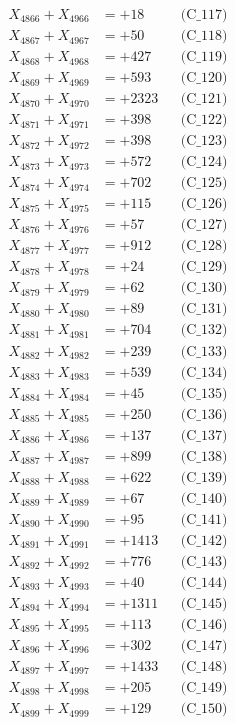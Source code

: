 \documentclass[a4paper,10pt]{article}
\begin{document}
{\begin{align}
X_{4866} + X_{4966} &= +18 && \text{(C\_117)} \\
X_{4867} + X_{4967} &= +50 && \text{(C\_118)} \\
X_{4868} + X_{4968} &= +427 && \text{(C\_119)} \\
X_{4869} + X_{4969} &= +593 && \text{(C\_120)} \\
\allowbreak
X_{4870} + X_{4970} &= +2323 && \text{(C\_121)} \\
X_{4871} + X_{4971} &= +398 && \text{(C\_122)} \\
X_{4872} + X_{4972} &= +398 && \text{(C\_123)} \\
X_{4873} + X_{4973} &= +572 && \text{(C\_124)} \\
X_{4874} + X_{4974} &= +702 && \text{(C\_125)} \\
\allowbreak
X_{4875} + X_{4975} &= +115 && \text{(C\_126)} \\
X_{4876} + X_{4976} &= +57 && \text{(C\_127)} \\
X_{4877} + X_{4977} &= +912 && \text{(C\_128)} \\
X_{4878} + X_{4978} &= +24 && \text{(C\_129)} \\
X_{4879} + X_{4979} &= +62 && \text{(C\_130)} \\
\allowbreak
X_{4880} + X_{4980} &= +89 && \text{(C\_131)} \\
X_{4881} + X_{4981} &= +704 && \text{(C\_132)} \\
X_{4882} + X_{4982} &= +239 && \text{(C\_133)} \\
X_{4883} + X_{4983} &= +539 && \text{(C\_134)} \\
X_{4884} + X_{4984} &= +45 && \text{(C\_135)} \\
\allowbreak
X_{4885} + X_{4985} &= +250 && \text{(C\_136)} \\
X_{4886} + X_{4986} &= +137 && \text{(C\_137)} \\
X_{4887} + X_{4987} &= +899 && \text{(C\_138)} \\
X_{4888} + X_{4988} &= +622 && \text{(C\_139)} \\
X_{4889} + X_{4989} &= +67 && \text{(C\_140)} \\
\allowbreak
X_{4890} + X_{4990} &= +95 && \text{(C\_141)} \\
X_{4891} + X_{4991} &= +1413 && \text{(C\_142)} \\
X_{4892} + X_{4992} &= +776 && \text{(C\_143)} \\
X_{4893} + X_{4993} &= +40 && \text{(C\_144)} \\
X_{4894} + X_{4994} &= +1311 && \text{(C\_145)} \\
\allowbreak
X_{4895} + X_{4995} &= +113 && \text{(C\_146)} \\
X_{4896} + X_{4996} &= +302 && \text{(C\_147)} \\
X_{4897} + X_{4997} &= +1433 && \text{(C\_148)} \\
X_{4898} + X_{4998} &= +205 && \text{(C\_149)} \\
X_{4899} + X_{4999} &= +129 && \text{(C\_150)} \\
\end{align}
}
\end{document}
